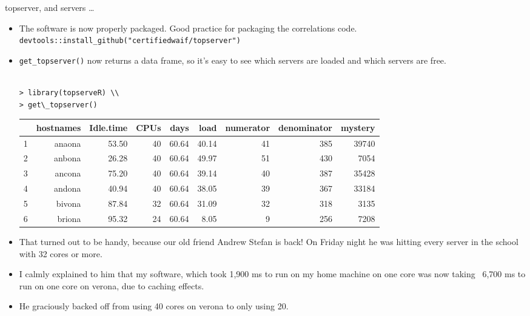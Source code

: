 \documentclass{beamer}
\begin{document}
\begin{frame}{topserver, and servers \ldots}
\begin{itemize}
\item The software is now properly packaged. Good practice for packaging the correlations code.
\small \texttt{devtools::install\_github("certifiedwaif/topserver")}
\item \texttt{get\_topserver()} now returns a data frame, so it's easy to see which servers are loaded and 
			which servers are free. 

{\tiny
\begin{verbatim}

> library(topserveR) \\
> get\_topserver()
\end{verbatim}
\begin{tabular}{|l|rrrrrrrr|}
\hline
   &hostnames &Idle.time &CPUs  &days  &load &numerator &denominator &mystery \\
\hline
1&     anaona&     53.50&   40& 60.64& 40.14&        41&         385&   39740 \\
2&     anbona&     26.28&   40& 60.64& 49.97&        51&         430&    7054 \\
3&     ancona&     75.20&   40& 60.64& 39.14&        40&         387&   35428 \\
4&     andona&     40.94&   40& 60.64& 38.05&        39&         367&   33184 \\
5&     bivona&     87.84&   32& 60.64& 31.09&        32&         318&    3135 \\
6&     briona&     95.32&   24& 60.64&  8.05&         9&         256&    7208 \\
\hline
\end{tabular}
}

\item That turned out to be handy, because our old friend Andrew Stefan is back! On Friday night he was 
			hitting every server in the school with	32 cores or more.
\item I calmly explained to him that my software, which took 1,900 ms to run on my home machine on one core 
			was now taking ~6,700 ms to run on one core on verona, due to caching effects.
\item He graciously backed off from using 40 cores on verona to only using 20.
\end{itemize}
\end{frame}
\end{document}
